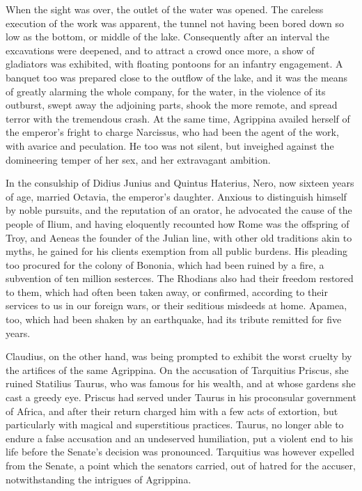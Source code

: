 When the sight was over, the outlet of the water was opened. The careless execution of the work was apparent, the tunnel not having been bored down so low as the bottom, or middle of the lake. Consequently after an interval the excavations were deepened, and to attract a crowd once more, a show of gladiators was exhibited, with floating pontoons for an infantry engagement. A banquet too was prepared close to the outflow of the lake, and it was the means of greatly alarming the whole company, for the water, in the violence of its outburst, swept away the adjoining parts, shook the more remote, and spread terror with the tremendous crash. At the same time, Agrippina availed herself of the emperor's fright to charge Narcissus, who had been the agent of the work, with avarice and peculation. He too was not silent, but inveighed against the domineering temper of her sex, and her extravagant ambition.


In the consulship of Didius Junius and Quintus Haterius, Nero, now sixteen years of age, married Octavia, the emperor's daughter. Anxious to distinguish himself by noble pursuits, and the reputation of an orator, he advocated the cause of the people of Ilium, and having eloquently recounted how Rome was the offspring of Troy, and Aeneas the founder of the Julian line, with other old traditions akin to myths, he gained for his clients exemption from all public burdens. His pleading too procured for the colony of Bononia, which had been ruined by a fire, a subvention of ten million sesterces. The Rhodians also had their freedom restored to them, which had often been taken away, or confirmed, according to their services to us in our foreign wars, or their seditious misdeeds at home. Apamea, too, which had been shaken by an earthquake, had its tribute remitted for five years.


Claudius, on the other hand, was being prompted to exhibit the worst cruelty by the artifices of the same Agrippina. On the accusation of Tarquitius Priscus, she ruined Statilius Taurus, who was famous for his wealth, and at whose gardens she cast a greedy eye. Priscus had served under Taurus in his proconsular government of Africa, and after their return charged him with a few acts of extortion, but particularly with magical and superstitious practices. Taurus, no longer able to endure a false accusation and an undeserved humiliation, put a violent end to his life before the Senate's decision was pronounced. Tarquitius was however expelled from the Senate, a point which the senators carried, out of hatred for the accuser, notwithstanding the intrigues of Agrippina.

